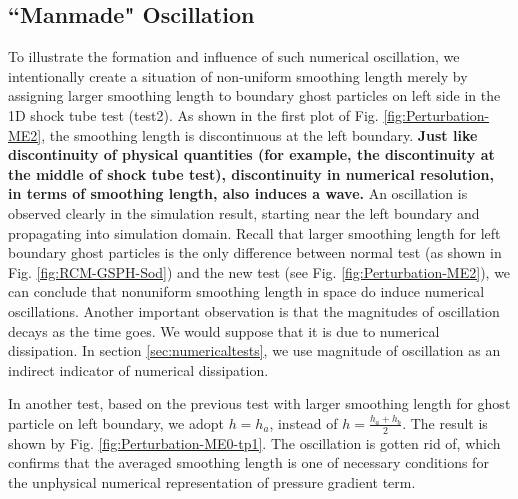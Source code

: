 \documentclass[preprint,12pt,authoryear]{elsarticle}
\begin{document}
\subsection{``Manmade"  Oscillation}
To illustrate the formation and influence of such numerical oscillation, we intentionally create a situation of non-uniform smoothing length merely by assigning larger smoothing length to boundary ghost particles on left side in the 1D shock tube test (test2). As shown in the first plot of Fig. \ref{fig:Perturbation-ME2}, the smoothing length is discontinuous at the left boundary. \textbf{Just like discontinuity of physical quantities (for example, the discontinuity at the middle of shock tube test), discontinuity in numerical resolution, in terms of smoothing length, also induces a wave.} An oscillation is observed clearly in the simulation result, starting near the left boundary and propagating into simulation domain. Recall that larger smoothing length for left boundary ghost particles is the only difference between normal test (as shown in Fig. \ref{fig:RCM-GSPH-Sod}) and the new test (see Fig. \ref{fig:Perturbation-ME2}), we can conclude that nonuniform smoothing length in space do induce numerical oscillations.  Another important observation is that the magnitudes of oscillation decays as the time goes. We would suppose that it is due to numerical dissipation. In section \ref{sec:numericaltests}, we use magnitude of oscillation as an indirect indicator of numerical dissipation.

In another test, based on the previous test with larger smoothing length for ghost particle on left boundary, we adopt $h = h_a$, instead of $h = \frac{h_a + h_b}{2}$. The result is shown by Fig. \ref{fig:Perturbation-ME0-tp1}. The oscillation is gotten rid of, which confirms that the averaged smoothing length is one of necessary conditions for the unphysical numerical representation of pressure gradient term.
\end{document}
